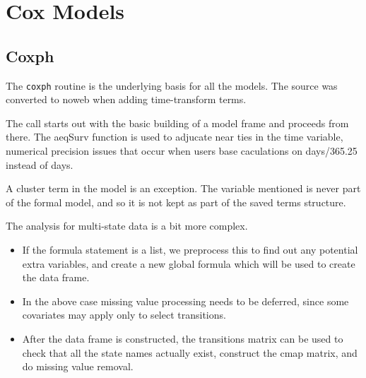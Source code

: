 \documentclass{article}
\begin{document}
\section{Cox Models}
\subsection{Coxph}
The \Verb!coxph! routine is the underlying basis for all the models.
The source was converted to noweb when adding time-transform terms.

The call starts out with the basic building of a model frame
and proceeds from there.
The aeqSurv function is used to adjucate near ties in the time
variable, numerical precision issues that occur when users base
caculations on days/365.25 instead of days.

A cluster term in the model is an exception.  The variable mentioned is
never part of the formal model, and so it is not kept as part of the saved
terms structure.

The analysis for multi-state data is a bit more complex.
\begin{itemize}
    \item If the formula statement is a list, we preprocess this to find out 
      any potential extra variables, and create a new global formula which
      will be used to create the data frame.
    \item In the above case missing value processing needs
      to be deferred, since some covariates may apply only to select
      transitions.
    \item After the data frame is constructed, the transitions matrix can be
      used to check that all the state names actually exist, construct the
      cmap matrix, and do missing value removal.
\end{itemize}
 
\end{document}
